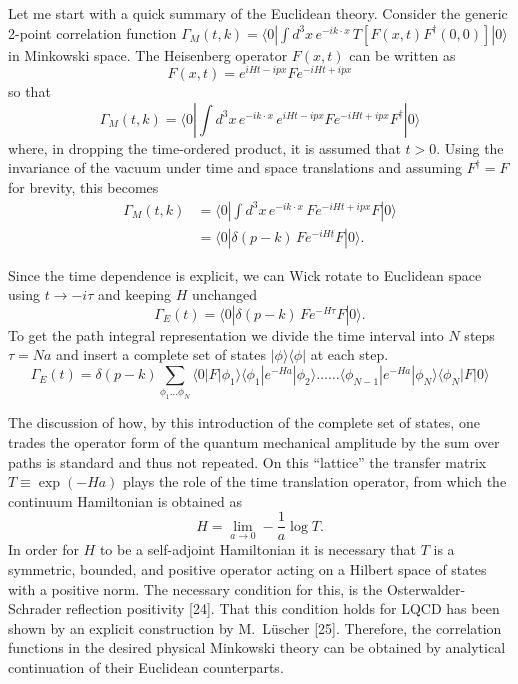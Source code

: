 Let me start with a quick summary of the Euclidean theory. Consider the generic 2-point correlation function $\Gamma_M(t,k) = \langle 0| \int d^3x\, e^{-ik\cdot x}\, T[F(x,t)F^\dagger(0,0)] |0\rangle$ in Minkowski space. The Heisenberg operator $F(x,t)$ can be written as
\begin{equation}
F(x,t) = e^{iHt-ipx} F e^{-iHt+ipx}
\label{eq:5.3}
\end{equation}
so that
\begin{equation}
\Gamma_M(t,k) = \langle 0| \int d^3x\, e^{-ik\cdot x}\, e^{iHt-ipx} F e^{-iHt+ipx} F^\dagger |0\rangle
\label{eq:5.4}
\end{equation}
where, in dropping the time-ordered product, it is assumed that $t > 0$. Using the invariance of the vacuum under time and space translations and assuming $F^\dagger = F$ for brevity, this becomes
\begin{equation}
\begin{aligned}
\Gamma_M(t,k) &= \langle 0| \int d^3x\, e^{-ik\cdot x}\, F e^{-iHt+ipx} F |0\rangle \\
&= \langle 0| \delta(p-k)\, F e^{-iHt} F |0\rangle .
\end{aligned}
\label{eq:5.5}
\end{equation}

Since the time dependence is explicit, we can Wick rotate to Euclidean space using $t \to -i\tau$ and keeping $H$ unchanged
\begin{equation}
\Gamma_E(t) = \langle 0| \delta(p-k)\, F e^{-H\tau} F |0\rangle .
\label{eq:5.6}
\end{equation}
To get the path integral representation we divide the time interval into $N$ steps $\tau = Na$ and insert a complete set of states $|\phi\rangle\langle\phi|$ at each step.
\begin{equation}
\Gamma_E(t) = \delta(p-k) \sum_{\phi_1 \ldots \phi_N} \langle 0|F|\phi_1\rangle \langle \phi_1| e^{-Ha} |\phi_2\rangle \ldots \ldots \langle \phi_{N-1}| e^{-Ha} |\phi_N\rangle \langle \phi_N| F |0\rangle
\label{eq:5.7}
\end{equation}

The discussion of how, by this introduction of the complete set of states, one trades the operator form of the quantum mechanical amplitude by the sum over paths is standard and thus not repeated. On this ``lattice'' the transfer matrix $T \equiv \exp(-Ha)$ plays the role of the time translation operator, from which the continuum Hamiltonian is obtained as
\begin{equation}
H = \lim_{a\to 0} -\frac{1}{a} \log T .
\label{eq:5.8}
\end{equation}
In order for $H$ to be a self-adjoint Hamiltonian it is necessary that $T$ is a symmetric, bounded, and positive operator acting on a Hilbert space of states with a positive norm. The necessary condition for this, is the Osterwalder-Schrader reflection positivity [24]. That this condition holds for LQCD has been shown by an explicit construction by M.~L\"uscher [25]. Therefore, the correlation functions in the desired physical Minkowski theory can be obtained by analytical continuation of their Euclidean counterparts.

